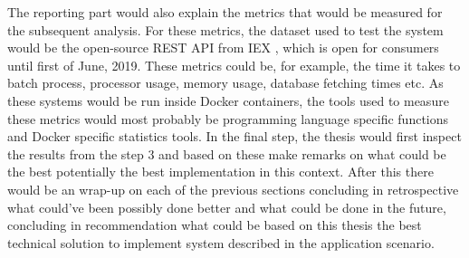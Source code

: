 The reporting part would also explain the metrics that would be measured for the subsequent analysis.
For these metrics, the dataset used to test the system would be the open-source REST API from IEX \cite{iex}, which is open for consumers until first of June, 2019.
These metrics could be, for example, the time it takes to batch process, processor usage, memory usage, database fetching times etc. 
As these systems would be run inside Docker containers, the tools used to measure these metrics would most probably be programming language specific functions and Docker specific statistics tools. 
In the final step, the thesis would first inspect the results from the step 3 and based on these make remarks on what could be the best potentially the best implementation in this context.
After this there would be an wrap-up on each of the previous sections concluding in retrospective what could've been possibly done better and what could be done in the future, concluding in recommendation what could be based on this thesis the best technical solution to implement system described in the application scenario. 
